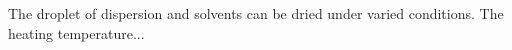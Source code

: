 \documentclass[\main/dresen_thesis.tex]{subfiles}
\begin{document}
  The droplet of dispersion and solvents can be dried under varied conditions.
  The heating temperature...
\end{document}
